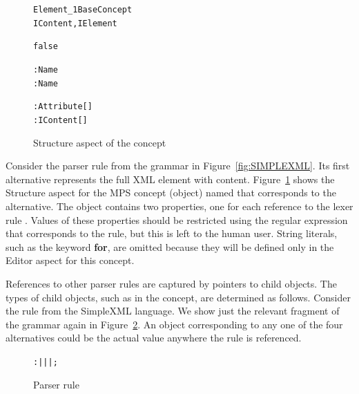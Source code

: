 \begin{figure}[ht]
\centering
\begin{alltt}
\small
{} Element\_1  BaseConcept
         IContent, IElement

   false
   \mpsstalias{< > </ >}
   

   : Name
   : Name
  
   : Attribute[]
     : IContent[]
\end{alltt}
\caption{Structure aspect of the  concept}
\label{fig:ELEMENTSTRUCT}
\end{figure}

Consider the parser rule  from the grammar in Figure~\ref{fig:SIMPLEXML}.
Its first alternative represents the full XML element with content.
Figure~\ref{fig:ELEMENTSTRUCT} shows the Structure aspect for the MPS concept (object) named  that corresponds to the alternative.
The object contains two properties, one for each reference to the lexer rule .
Values of these properties should be restricted using the regular expression that corresponds to the  rule, but this is left to the human user.
String literals, such as the keyword \textbf{for}, are omitted because they will be defined only in the Editor aspect for this concept.

References to other parser rules are captured by pointers to child objects.
The types of child objects, such as  in the  concept, are determined as follows.
Consider the  rule from the SimpleXML language.
We show just the relevant fragment of the grammar again in Figure~\ref{fig:CONTENTRULE}.
An object corresponding to any one of the four alternatives could be the actual value anywhere the  rule is referenced.

\begin{figure}[ht]
\centering
\begin{alltt}
\small
{} :  |  |  |  ;
\end{alltt}
\caption{Parser rule }
\label{fig:CONTENTRULE}
\end{figure}

